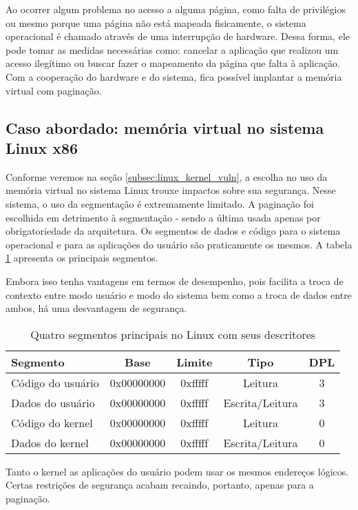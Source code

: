 			
			Ao ocorrer algum problema no acesso a alguma página, como falta de privilégios
			ou mesmo porque uma página não está mapeada fisicamente, o sistema operacional
			é chamado através de uma interrupção de hardware. Dessa forma, ele pode
			tomar as medidas necessárias como: cancelar a aplicação que realizou um acesso
			ilegítimo ou buscar fazer o mapeamento da página que falta à aplicação.
			Com a cooperação do hardware e do sistema, fica possível implantar a memória
			virtual com paginação.
			

		\subsection{Caso abordado: memória virtual no sistema Linux x86} 
		\label{subsec:memoria_virtual_linux_x86}
			Conforme veremos na seção \ref{subsec:linux_kernel_vuln}, a escolha no uso da
			memória virtual no sistema Linux trouxe impactos sobre sua segurança.
			Nesse sistema, o uso da segmentação é extremamente limitado.
			A paginação foi escolhida em detrimento à segmentação - sendo a última
			usada apenas por obrigatoriedade da arquitetura.
			Os segmentos de dados e código para o sistema operacional e para as aplicações do
			usuário são praticamente os mesmos. A tabela \ref{tab:descritores_segmentos_linux}
			apresenta os principais segmentos.


			Embora isso tenha vantagens em termos de desempenho, pois facilita a troca
			de contexto entre modo usuário e modo do sistema bem como a troca de dados
			entre ambos, há uma desvantagem de segurança.
			\begin{table}
				\begin{tabular}{|l|c|c|c|c|}
					\hline
						\textbf{Segmento} & \textbf{Base} & \textbf{Limite} & \textbf{Tipo} & \textbf{DPL}\\
					\hline
						Código do usuário & 0x00000000 & 0xfffff & Leitura & 3\\
					\hline
						Dados do usuário & 0x00000000 & 0xfffff & Escrita/Leitura &	3\\
					\hline
						Código do kernel & 0x00000000 & 0xfffff & Leitura &	0\\
					\hline
						Dados do kernel & 0x00000000 & 0xfffff & Escrita/Leitura &	0\\
					\hline
				\end{tabular}
				\caption{Quatro segmentos principais no Linux com seus descritores}\label{tab:descritores_segmentos_linux}
			\end{table}
			Tanto o kernel as aplicações do usuário podem usar os mesmos endereços lógicos.
			Certas restrições de segurança acabam recaindo, portanto, apenas para a paginação.
			

